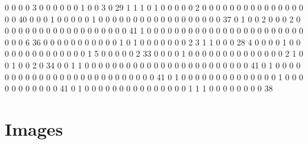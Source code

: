      0     0     0     0     3     0     0     0     0     0     0     1     0     0     3     0    29     1     1     1     0     1     0     0     0     0     0     2
     0     0     0     0     0     0     0     0     0     0     0     0     0     0     0     0     0    40     0     0     0     1     0     0     0     0     0     1
     0     0     0     0     0     0     0     0     0     0     0     0     0     0     0     0     0     0    37     0     1     0     0     2     0     0     0     2
     0     0     0     0     0     0     0     0     0     0     0     0     0     0     0     0     0     0     0    41     1     0     0     0     0     0     0     0
     0     0     0     0     0     0     0     0     0     0     0     0     0     0     0     0     0     0     0     6    36     0     0     0     0     0     0     0
     0     0     0     0     1     0     1     0     0     0     0     0     0     0     2     3     1     1     0     0     0    28     4     0     0     0     0     1
     0     0     0     0     0     0     0     0     0     0     0     0     0     0     1     5     0     0     0     0     0     2    33     0     0     0     0     1
     0     0     0     0     0     0     0     0     0     0     0     0     0     0     2     1     0     0     1     0     0     2     0    34     0     0     1     1
     0     0     0     0     0     0     0     0     0     0     0     0     0     0     0     0     0     0     0     0     0     0     0     0    41     0     1     0
     0     0     0     0     0     0     0     0     0     0     0     0     0     0     0     0     0     0     0     0     0     0     0     0     0    41     0     1
     0     0     0     0     0     0     0     0     0     0     0     0     0     0     1     0     0     0     0     0     0     0     0     0     0     0    41     0
     1     0     0     0     0     0     0     0     0     0     0     0     0     0     0     0     1     1     1     0     0     0     0     0     0     0     0    38



\section{Images}

